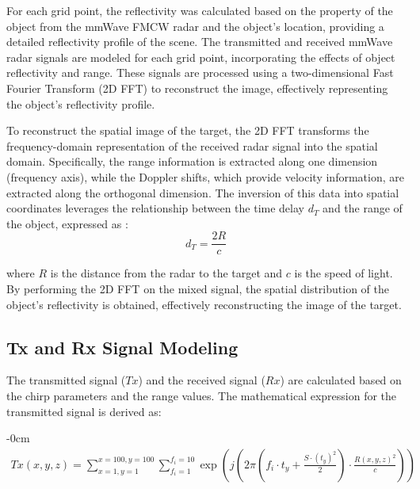 \documentclass[journal,article,submit,pdftex,moreauthors]{Definitions/mdpi}
\begin{document}
For each grid point, the reflectivity was calculated based on the property of the object from the mmWave FMCW radar and the object's location, providing a detailed reflectivity profile of the scene. The transmitted and received mmWave radar signals are modeled for each grid point, incorporating the effects of object reflectivity and range. These signals are processed using a two-dimensional Fast Fourier Transform (2D FFT) to reconstruct the image, effectively representing the object's reflectivity profile.

To reconstruct the spatial image of the target, the 2D FFT transforms the frequency-domain representation of the received radar signal into the spatial domain. Specifically, the range information is extracted along one dimension (frequency axis), while the Doppler shifts, which provide velocity information, are extracted along the orthogonal dimension. The inversion of this data into spatial coordinates leverages the relationship between the time delay \(d_T\) and the range of the object, expressed as \cite{liu2021deep, park2020high}:
\begin{equation}
    d_T = \frac{2R}{c}
\end{equation}

where \(R\) is the distance from the radar to the target and \(c\) is the speed of light. By performing the 2D FFT on the mixed signal, the spatial distribution of the object's reflectivity is obtained, effectively reconstructing the image of the target.

\subsection{Tx and Rx Signal Modeling}
The transmitted signal (\(Tx\)) and the received signal (\( Rx\)) are calculated based on the chirp parameters and the range values. The mathematical expression for the transmitted signal is derived as:

\begin{adjustwidth}{-\extralength}{0cm}
\begin{equation}
   \begin{aligned}
    Tx(x, y, z) = \sum_{x=1, y=1}^{x=100, y=100} \sum_{f_i=1}^{f_i =10} \exp \left( j \left( 2 \pi \left( f_i \cdot t_y + 
    \frac{S \cdot (t_y)^2}{2} \right) \cdot \frac{R(x, y, z)^2}{c} \right) \right)
    \end{aligned}
\end{equation}
\end{adjustwidth}
\end{document}
